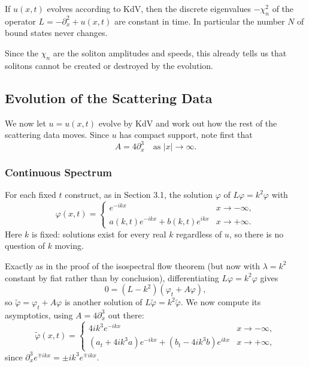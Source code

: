 \begin{corollary}
	If $u(x,t)$ evolves according to KdV, then the discrete eigenvalues $-\chi_n^2$ of the operator $L = -\partial_x^2 + u(x,t)$ are constant in time. In particular the number $N$ of bound states never changes.
\end{corollary}

Since the $\chi_n$ are the soliton amplitudes and speeds, this already tells us that solitons cannot be created or destroyed by the evolution.

\subsection{Evolution of the Scattering Data}

We now let $u = u(x,t)$ evolve by KdV and work out how the rest of the scattering data moves. Since $u$ has compact support, note first that
$$
A = 4\partial_x^3 \quad\text{as } |x|\to\infty.
$$

\subsubsection{Continuous Spectrum}

For each fixed $t$ construct, as in Section 3.1, the solution $\varphi$ of $L\varphi = k^2\varphi$ with
$$
\varphi(x,t) = \begin{cases}e^{-ikx} & x\to-\infty,\\ a(k,t)e^{-ikx} + b(k,t)e^{ikx} & x\to+\infty.\end{cases}
$$
Here $k$ is fixed: solutions exist for every real $k$ regardless of $u$, so there is no question of $k$ moving.

Exactly as in the proof of the isospectral flow theorem (but now with $\lambda = k^2$ constant by fiat rather than by conclusion), differentiating $L\varphi = k^2\varphi$ gives
$$
0 = (L - k^2)\left(\varphi_t + A\varphi\right),
$$
so $\tilde\varphi = \varphi_t + A\varphi$ is another solution of $L\tilde\varphi = k^2\tilde\varphi$. We now compute its asymptotics, using $A = 4\partial_x^3$ out there:
$$
\tilde\varphi(x,t) = \begin{cases}
	4ik^3e^{-ikx} & x\to-\infty,\\
	\left(a_t + 4ik^3a\right)e^{-ikx} + \left(b_t - 4ik^3b\right)e^{ikx} & x\to+\infty,
\end{cases}
$$
since $\partial_x^3e^{\mp ikx} = \pm ik^3e^{\mp ikx}$.

